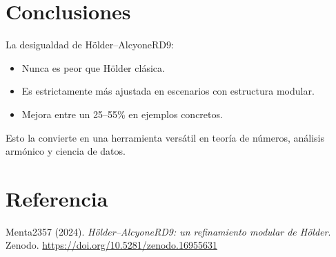 \documentclass[12pt,a4paper]{article}
\theoremstyle{plain}
\begin{document}
\section{Conclusiones}
La desigualdad de Hölder–AlcyoneRD9:
\begin{itemize}
    \item Nunca es peor que Hölder clásica.
    \item Es estrictamente más ajustada en escenarios con estructura modular.
    \item Mejora entre un 25--55\% en ejemplos concretos.
\end{itemize}

Esto la convierte en una herramienta versátil en teoría de números, análisis armónico y ciencia de datos.

\section*{Referencia}
Menta2357 (2024). \emph{Hölder–AlcyoneRD9: un refinamiento modular de Hölder}. Zenodo. \url{https://doi.org/10.5281/zenodo.16955631}
\end{document}
